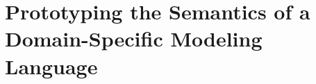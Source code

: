 \chapter{Prototyping the Semantics of a Domain-Specific Modeling Language}
\label{chap:prototype-semantics}





%









 